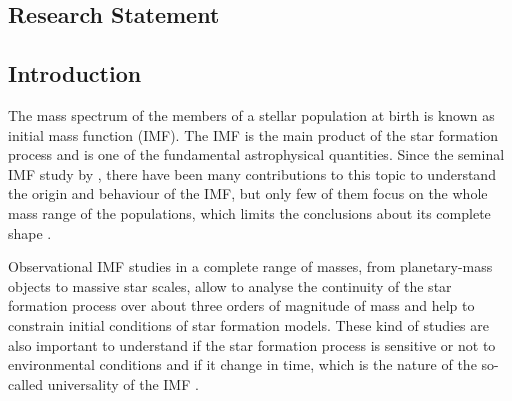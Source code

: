 \documentclass[12pt]{article}
\begin{document}
\subsection{Research Statement}
\label{sec:rs_photometry}

\subsection{Introduction}
\label{sec_IMF:introduction}

The mass spectrum of the members of a stellar population at birth is known as initial mass function (\ac{IMF}). The IMF is the main product of the star formation process and is one of the fundamental astrophysical quantities. Since the seminal IMF study by \citet{Salpeter1955}, there have been many contributions to this topic to understand the origin and behaviour of the IMF, but only few of them focus on the whole mass range of the populations, which limits the conclusions about its complete shape \cite[e.g.][and references therein]{Bastian2010}.

Observational IMF studies in a complete range of masses, from planetary-mass objects to massive star scales, allow to analyse the continuity of the star formation process over about three orders of magnitude of mass and help to constrain initial conditions of star formation models. These kind of studies are also important to understand if the star formation process is sensitive or not to environmental conditions and if it change in time, which is the nature of the so-called universality of the IMF \cite[e.g.][]{Kroupa2013,Offner2014}.
\end{document}
